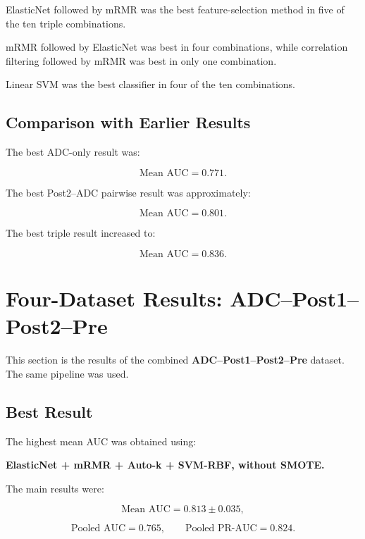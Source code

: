 \documentclass[10pt,a4paper]{article}
\begin{document}
ElasticNet followed by mRMR was the best feature-selection method in five of the ten triple combinations.

mRMR followed by ElasticNet was best in four combinations, while correlation filtering followed by mRMR was best in only one combination.

Linear SVM was the best classifier in four of the ten combinations. 

\subsection{Comparison with Earlier Results}

The best ADC-only result was:

\[
\text{Mean AUC}=0.771.
\]

The best Post2--ADC pairwise result was approximately:

\[
\text{Mean AUC}=0.801.
\]

The best triple result increased to:

\[
\text{Mean AUC}=0.836.
\]














\section{Four-Dataset Results: ADC--Post1--Post2--Pre}

This section is the results of the combined
\textbf{ADC--Post1--Post2--Pre} dataset. The same pipeline was used.

\subsection{Best Result}

The highest mean AUC was obtained using:

\begin{center}
\textbf{ElasticNet + mRMR + Auto-k
+ SVM-RBF, without SMOTE.}
\end{center}

The main results were:

\[
\text{Mean AUC}=0.813\pm0.035,
\]

\[
\text{Pooled AUC}=0.765,
\qquad
\text{Pooled PR-AUC}=0.824.
\]
\end{document}
